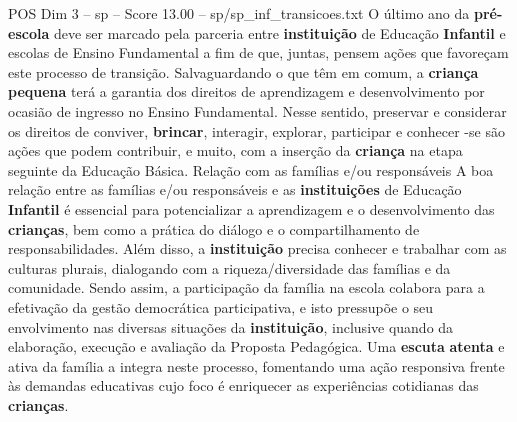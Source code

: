 \begin{textsample}{POS Dim 3 – sp – Score 13.00 – sp/sp\_inf\_transicoes.txt}
O último ano da \textbf{pré-escola} deve ser marcado pela parceria entre \textbf{instituição} de Educação \textbf{Infantil} e escolas de Ensino Fundamental a fim de que, juntas, pensem ações que favoreçam este processo de transição.
Salvaguardando o que têm em comum, a \textbf{criança} \textbf{pequena} terá a garantia dos direitos de aprendizagem e desenvolvimento por ocasião de ingresso no Ensino Fundamental.
Nesse sentido, preservar e considerar os direitos de conviver, \textbf{brincar}, interagir, explorar, participar e conhecer -se são ações que podem contribuir, e muito, com a inserção da \textbf{criança} na etapa seguinte da Educação Básica.
Relação com as famílias e/ou responsáveis A boa relação entre as famílias e/ou responsáveis e as \textbf{instituições} de Educação \textbf{Infantil} é essencial para potencializar a aprendizagem e o desenvolvimento das \textbf{crianças}, bem como a prática do diálogo e o compartilhamento de responsabilidades.
Além disso, a \textbf{instituição} precisa conhecer e trabalhar com as culturas plurais, dialogando com a riqueza/diversidade das famílias e da comunidade.
Sendo assim, a participação da família na escola colabora para a efetivação da gestão democrática participativa, e isto pressupõe o seu envolvimento nas diversas situações da \textbf{instituição}, inclusive quando da elaboração, execução e avaliação da Proposta Pedagógica.
Uma \textbf{escuta} \textbf{atenta} e ativa da família a integra neste processo, fomentando uma ação responsiva frente às demandas educativas cujo foco é enriquecer as experiências cotidianas das \textbf{crianças}.

\end{textsample}
